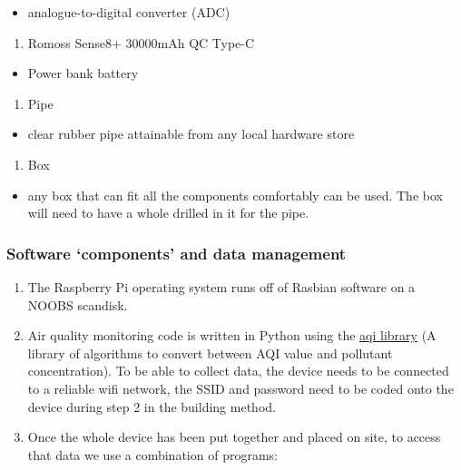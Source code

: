 \documentclass[
  authoryear,
  review,
  3p]{elsarticle}
\providecommand{\tightlist}{%
  \setlength{\itemsep}{0pt}\setlength{\parskip}{0pt}}\usepackage{longtable,booktabs,array}
\begin{document}
\begin{itemize}
\tightlist
\item
  analogue-to-digital converter (ADC)
\end{itemize}

\begin{enumerate}
\def\labelenumi{\arabic{enumi}.}
\setcounter{enumi}{3}
\tightlist
\item
  Romoss Sense8+ 30000mAh QC Type-C
\end{enumerate}

\begin{itemize}
\tightlist
\item
  Power bank battery
\end{itemize}

\begin{enumerate}
\def\labelenumi{\arabic{enumi}.}
\setcounter{enumi}{4}
\tightlist
\item
  Pipe
\end{enumerate}

\begin{itemize}
\tightlist
\item
  clear rubber pipe attainable from any local hardware store
\end{itemize}

\begin{enumerate}
\def\labelenumi{\arabic{enumi}.}
\setcounter{enumi}{5}
\tightlist
\item
  Box
\end{enumerate}

\begin{itemize}
\tightlist
\item
  any box that can fit all the components comfortably can be used. The
  box will need to have a whole drilled in it for the pipe.
\end{itemize}

\hypertarget{software-components-and-data-management}{%
\subsubsection*{Software `components' and data
management}\label{software-components-and-data-management}}

\begin{enumerate}
\def\labelenumi{\arabic{enumi}.}
\tightlist
\item
  The Raspberry Pi operating system runs off of Rasbian software on a
  NOOBS scandisk.
\item
  Air quality monitoring code is written in Python using the
  \href{https://pypi.org/project/python-aqi/}{aqi library} (A library of
  algorithms to convert between AQI value and pollutant concentration).
  To be able to collect data, the device needs to be connected to a
  reliable wifi network, the SSID and password need to be coded onto the
  device during step 2 in the building method.
\item
  Once the whole device has been put together and placed on site, to
  access that data we use a combination of programs:
\end{enumerate}
\end{document}
